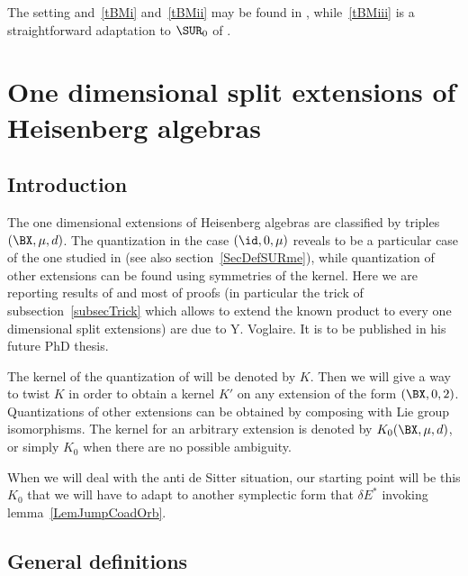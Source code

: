 The setting and~\ref{tBMi} and~\ref{tBMii} may be found in \cite{Biel-Massar}, while~\ref{tBMiii} is a straightforward adaptation  to $\SUR_0$ of \cite{lcBBM}.


%
   \section{One dimensional split extensions of Heisenberg algebras} \label{SecExtHeiz}
%

\subsection{Introduction}

The one dimensional extensions of Heisenberg algebras are classified by triples $(\BX,\mu,d)$. The quantization in the case $(\id,0,\mu)$  reveals to be a particular case of the one studied in \cite{Biel-Massar} (see also section~\ref{SecDefSURme}),%
while quantization of other extensions can be found using symmetries of the kernel. Here we are reporting results of \cite{articleBVCS} and most of proofs (in particular the trick of subsection~\ref{subsecTrick} %
which allows to extend the known product to every one dimensional split extensions) are due to Y. Voglaire. It is to be published in his future PhD thesis.

The kernel of the quantization of \cite{Biel-Massar} will be denoted by $K$.  Then we will give a way to twist $K$ in order to obtain a kernel $K'$ on any extension of the form $(\BX,0,2)$. Quantizations of other extensions can be obtained by composing with Lie group isomorphisms. The kernel for an arbitrary extension is denoted by $K_{0}(\BX,\mu,d)$, or simply $K_{0}$ when there are no possible ambiguity.

When we will deal with the anti de Sitter situation, our starting point will be this $K_{0}$ that we will have to adapt to another symplectic form that $\delta E^*$ invoking lemma~\ref{LemJumpCoadOrb}.

\subsection{General definitions}

